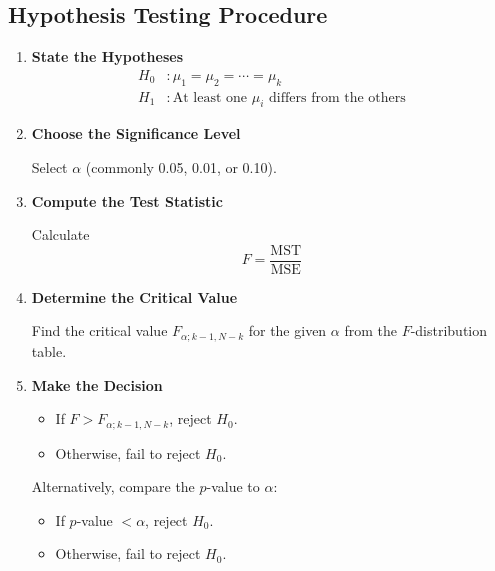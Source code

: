 \documentclass[twoside]{book}
\begin{document}
\subsection{Hypothesis Testing Procedure}

\begin{enumerate}
\item \textbf{State the Hypotheses}
\begin{align*}
H_0 &: \mu_1 = \mu_2 = \cdots = \mu_k \\
H_1 &: \text{At least one } \mu_i \text{ differs from the others}
\end{align*}

\item \textbf{Choose the Significance Level}

Select $\alpha$ (commonly 0.05, 0.01, or 0.10).

\item \textbf{Compute the Test Statistic}

Calculate $$F = \frac{\text{MST}}{\text{MSE}}$$

\item \textbf{Determine the Critical Value}

Find the critical value $F_{\alpha; k-1, N-k}$ for the given $\alpha$ from the $F$-distribution table.

\item \textbf{Make the Decision}
\begin{itemize}
\item If $F > F_{\alpha; k-1, N-k}$, reject $H_0$.
\item Otherwise, fail to reject $H_0$.
\end{itemize}

Alternatively, compare the $ p $-value to $\alpha$:
\begin{itemize}
\item If $ p $-value $< \alpha$, reject $H_0$.
\item Otherwise, fail to reject $H_0$.
\end{itemize}

\end{enumerate}
\end{document}

